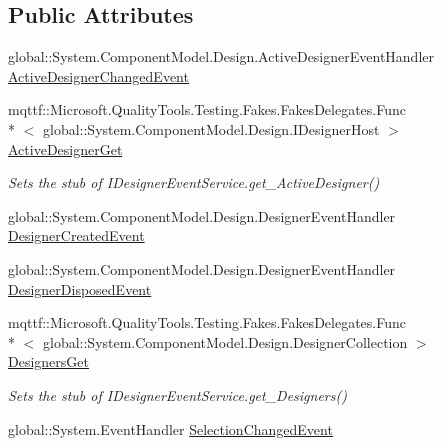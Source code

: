 \subsection*{Public Attributes}
\begin{DoxyCompactItemize}
\item 
global\-::\-System.\-Component\-Model.\-Design.\-Active\-Designer\-Event\-Handler \hyperlink{class_system_1_1_component_model_1_1_design_1_1_fakes_1_1_stub_i_designer_event_service_a96dba2be7f54481d7bf61feec955f407}{Active\-Designer\-Changed\-Event}
\item 
mqttf\-::\-Microsoft.\-Quality\-Tools.\-Testing.\-Fakes.\-Fakes\-Delegates.\-Func\\*
$<$ global\-::\-System.\-Component\-Model.\-Design.\-I\-Designer\-Host $>$ \hyperlink{class_system_1_1_component_model_1_1_design_1_1_fakes_1_1_stub_i_designer_event_service_a34067f5c6599a39ba4f99e4f3586c8f8}{Active\-Designer\-Get}
\begin{DoxyCompactList}\small\item\em Sets the stub of I\-Designer\-Event\-Service.\-get\-\_\-\-Active\-Designer()\end{DoxyCompactList}\item 
global\-::\-System.\-Component\-Model.\-Design.\-Designer\-Event\-Handler \hyperlink{class_system_1_1_component_model_1_1_design_1_1_fakes_1_1_stub_i_designer_event_service_a7b52de803d8971618b1a8596049d1256}{Designer\-Created\-Event}
\item 
global\-::\-System.\-Component\-Model.\-Design.\-Designer\-Event\-Handler \hyperlink{class_system_1_1_component_model_1_1_design_1_1_fakes_1_1_stub_i_designer_event_service_aa91ae52e040ea145f8cf7bb878b9ca9d}{Designer\-Disposed\-Event}
\item 
mqttf\-::\-Microsoft.\-Quality\-Tools.\-Testing.\-Fakes.\-Fakes\-Delegates.\-Func\\*
$<$ global\-::\-System.\-Component\-Model.\-Design.\-Designer\-Collection $>$ \hyperlink{class_system_1_1_component_model_1_1_design_1_1_fakes_1_1_stub_i_designer_event_service_a168af9440ee0681f739fd4b5ac0cf5ab}{Designers\-Get}
\begin{DoxyCompactList}\small\item\em Sets the stub of I\-Designer\-Event\-Service.\-get\-\_\-\-Designers()\end{DoxyCompactList}\item 
global\-::\-System.\-Event\-Handler \hyperlink{class_system_1_1_component_model_1_1_design_1_1_fakes_1_1_stub_i_designer_event_service_ac678f0b4ee3f73faef54757cf33e1c09}{Selection\-Changed\-Event}
\end{DoxyCompactItemize}



